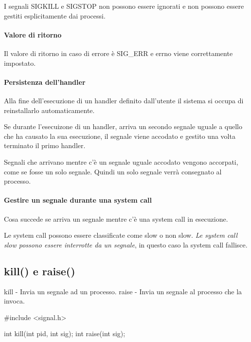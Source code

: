 \documentclass
[10pt,        %
 a4paper,     %
 onecolumn,   %
 fleqn,       %
 oneside,     %
 notitlepage, %
]{article}    %
\begin{document}


I segnali SIGKILL e SIGSTOP non possono essere ignorati e non possono essere gestiti esplicitamente dai processi.

\paragraph{Valore di ritorno}
Il valore di ritorno in caso di errore è SIG\_ERR e errno viene correttamente impostato.

\paragraph{Persistenza dell'handler}
Alla fine dell'esecuzione di un handler definito dall'utente il sistema si occupa di reinstallarlo automaticamente.

Se durante l'esecuizone di un handler, arriva un secondo segnale uguale a quello che ha causato la sua esecuzione, il segnale viene accodato e gestito una volta terminato il primo handler.

Segnali che arrivano mentre c'è un segnale uguale accodato vengono accorpati, come se fosse un solo segnale. Quindi un solo segnale verrà consegnato al processo.


\paragraph{Gestire un segnale durante una system call}
Cosa succede se arriva un segnale mentre c'è una system call in esecuzione.

Le system call possono essere classificate come slow o non slow. \textit{Le system call slow possono essere interrotte da un segnale}, in questo caso la system call fallisce.








\subsection{kill() e raise()}
kill - Invia un segnale ad un processo.
raise - Invia un segnale al processo che la invoca.
\begin{C}
#include <signal.h>

int kill(int pid, int sig);
int raise(int sig);
\end{C}
\end{document}
